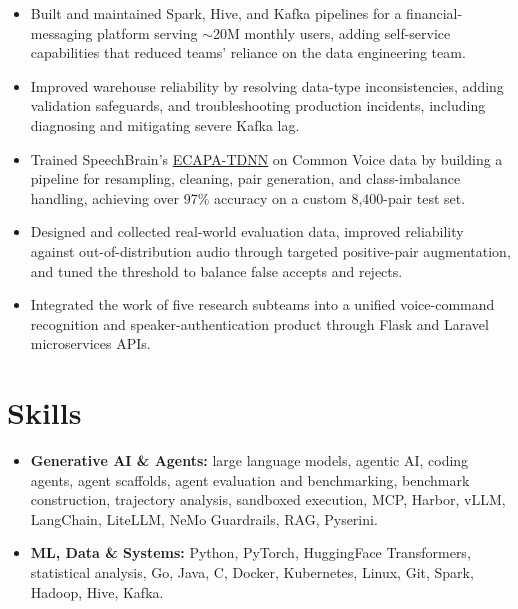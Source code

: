 \documentclass[11pt,letterpaper]{article}
\begin{document}
\begin{itemize}
  \item Built and maintained Spark, Hive, and Kafka pipelines for a financial-messaging platform serving $\sim$20M monthly users, adding self-service capabilities that reduced teams’ reliance on the data engineering team.
  \item Improved warehouse reliability by resolving data-type inconsistencies, adding validation safeguards, and troubleshooting production incidents, including diagnosing and mitigating severe Kafka lag.
\end{itemize}

\begin{itemize}
  \item Trained SpeechBrain’s \href{https://arxiv.org/abs/2104.01466}{ECAPA-TDNN} on Common Voice data by building a pipeline for resampling, cleaning, pair generation, and class-imbalance handling, achieving over 97\% accuracy on a custom 8,400-pair test set.
  \item Designed and collected real-world evaluation data, improved reliability against out-of-distribution audio through targeted positive-pair augmentation, and tuned the threshold to balance false accepts and rejects.
  \item Integrated the work of five research subteams into a unified voice-command recognition and speaker-authentication product through Flask and Laravel microservices APIs.
\end{itemize}

\section*{Skills}
\begin{itemize}
  \item \textbf{Generative AI \& Agents:} large language models, agentic AI, coding agents, agent scaffolds, agent evaluation and benchmarking, benchmark construction, trajectory analysis, sandboxed execution, MCP, Harbor, vLLM, LangChain, LiteLLM, NeMo Guardrails, RAG, Pyserini.
  \item \textbf{ML, Data \& Systems:} Python, PyTorch, HuggingFace Transformers, statistical analysis, Go, Java, C, Docker, Kubernetes, Linux, Git, Spark, Hadoop, Hive, Kafka.
\end{itemize}
\end{document}
